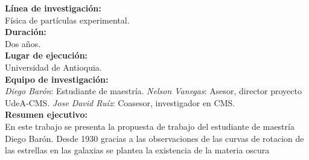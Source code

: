 \textbf{Línea de investigación:}\\
Física de partículas experimental.
\\

\textbf{Duración:}\\
Dos años.
\\

\textbf{Lugar de ejecución:}\\
Universidad de Antioquia.
\\

\textbf{Equipo de investigación:}\\
\emph{Diego Barón}: Estudiante de maestría.
\emph{Nelson Vanegas}: Asesor, director proyecto UdeA-CMS.
\emph{Jose David Ruíz}: Coasesor, investigador en CMS.
\\

\textbf{Resumen ejecutivo:}\\
En este trabajo se presenta la propuesta de trabajo del estudiante de maestría Diego Barón. Desde 1930 gracias a las observaciones de las curvas de rotacion de las estrellas en las galaxias se plantea la existencia de la materia oscura 


\newpage























